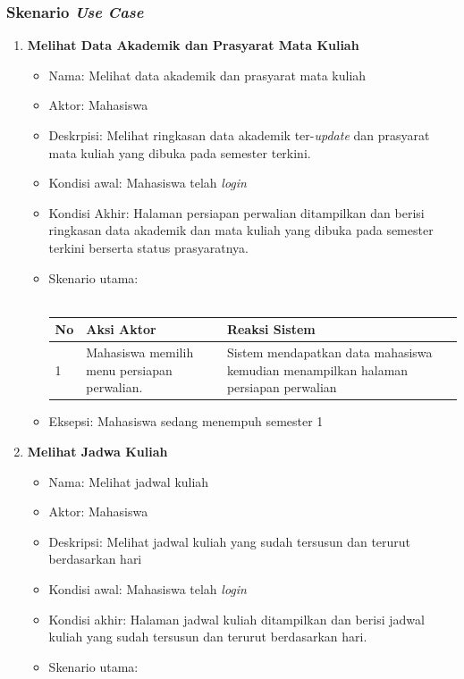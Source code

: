 \subsubsection{Skenario \textit{Use Case}}
\begin{enumerate}
	\item \textbf{Melihat Data Akademik dan Prasyarat Mata Kuliah}
		\begin{itemize}
			\item Nama: Melihat data akademik dan prasyarat mata kuliah
			\item Aktor: Mahasiswa
			\item Deskrpisi: Melihat ringkasan data akademik ter-\textit{update} dan prasyarat mata kuliah yang dibuka pada semester terkini.
			\item Kondisi awal: Mahasiswa telah \textit{login}
			\item Kondisi Akhir: Halaman persiapan perwalian ditampilkan dan berisi ringkasan data akademik dan mata kuliah yang dibuka pada semester terkini berserta status prasyaratnya.
			\item Skenario utama: \\ \\
				\begin{tabular}{|p{0.5cm} |p{6cm}| p{6cm}|}
						\hline
							No 	& Aksi Aktor & Reaksi Sistem \\ \hline
							1 	& Mahasiswa memilih menu persiapan perwalian. 	&	Sistem mendapatkan data mahasiswa kemudian menampilkan halaman persiapan perwalian \\ \hline 
						\end{tabular}
				\item Eksepsi: Mahasiswa sedang menempuh semester 1
		\end{itemize}
	\item \textbf{Melihat Jadwa Kuliah}
		\begin{itemize}
			\item Nama: Melihat jadwal kuliah
			\item Aktor: Mahasiswa
			\item Deskripsi: Melihat jadwal kuliah yang sudah tersusun dan terurut berdasarkan hari
			\item Kondisi awal: Mahasiswa telah \textit{login}
			\item Kondisi akhir: Halaman jadwal kuliah ditampilkan dan berisi jadwal kuliah yang sudah tersusun dan terurut berdasarkan hari.
			\item Skenario utama: \\ \\

\end{itemize}
\end{enumerate}
